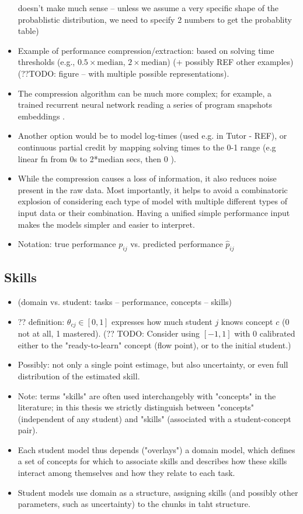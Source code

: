 \begin{itemize}
  doesn't make much sense -- unless we assume a very specific shape of the
  probablistic distribution, we need to specify 2 numbers to get the probablity
  table)
\item Example of performance compression/extraction:
  based on solving time thresholds
  (e.g., $0.5 \times \text{median}$, $2 \times \text{median}$)
  (+ possibly REF other examples)
  (??TODO: figure -- with multiple possible representations).
\item The compression algorithm can be much more complex;
  for example, a trained recurrent neural network reading a series
  of program snapshots embeddings  %
  \cite{student-models-deep-learning}.
\item Another option would be to model log-times (used e.g. in Tutor - REF),
  or continuous partial credit by mapping solving times to the 0-1 range
  (e.g linear fn from 0s to 2*median secs, then 0 \cite{alg.mastery}).
\item While the compression causes a loss of information,
  it also reduces noise present in the raw data.
  Most importantly, it helps to avoid a combinatoric explosion of
  considering each type of model with multiple different types of input data or
  their combination.
  Having a unified simple performance input makes the models simpler and
  easier to interpret.
\item Notation: true performance $p_{ij}$ vs. predicted performance $\hat{p}_{ij}$
\end{itemize}


\subsection{Skills}

\begin{itemize}
\item (domain vs. student: tasks -- performance, concepts -- skills)
\item ?? definition:
  $\theta_{cj} \in [0, 1]$ expresses how much student $j$ knows concept $c$
  (0 not at all, 1 mastered).
  (?? TODO: Consider using $[-1, 1]$ with 0 calibrated either to the "ready-to-learn"
  concept (flow point), or to the initial student.)
\item Possibly: not only a single point estimage, but also uncertainty,
  or even full distribution of the estimated skill.
\item Note: terms "skills" are often used interchangebly with "concepts" in
  the literature; in this thesis we strictly distinguish between "concepts"
  (independent of any student) and "skills" (associated with a student-concept
  pair).
\item Each student model thus depends ("overlays") a domain model, which
  defines a set of concepts for which to associate skills
  and describes how these skills interact among themselves and how they
  relate to each task.
\item Student models use domain as a structure,
  assigning skills (and possibly other parameters, such as uncertainty)
  to the chunks in taht structure.
\end{itemize}


